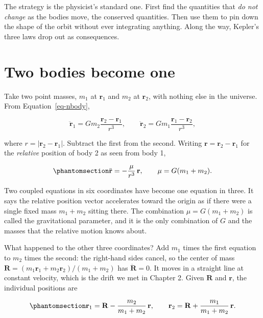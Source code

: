 \documentclass[
  10.5pt,
  letterpaper,
]{scrbook}
\theoremstyle{definition}
\theoremstyle{plain}
\theoremstyle{remark}
\begin{document}
The strategy is the physicist's standard one. First find the quantities
that \emph{do not change} as the bodies move, the conserved quantities.
Then use them to pin down the shape of the orbit without ever
integrating anything. Along the way, Kepler's three laws drop out as
consequences.

\section{Two bodies become one}\label{two-bodies-become-one}

Take two point masses, \(m_1\) at \(\mathbf{r}_1\) and \(m_2\) at
\(\mathbf{r}_2\), with nothing else in the universe. From
Equation~\ref{eq-nbody},

\[
\ddot{\mathbf{r}}_1 = G m_2 \frac{\mathbf{r}_2 - \mathbf{r}_1}{r^3}, \qquad
\ddot{\mathbf{r}}_2 = G m_1 \frac{\mathbf{r}_1 - \mathbf{r}_2}{r^3},
\]

where \(r = |\mathbf{r}_2 - \mathbf{r}_1|\). Subtract the first from the
second. Writing \(\mathbf{r} = \mathbf{r}_2 - \mathbf{r}_1\) for the
\emph{relative} position of body 2 as seen from body 1,

\begin{equation}\protect\phantomsection\label{eq-relative}{
\ddot{\mathbf{r}} = -\frac{\mu}{r^3}\,\mathbf{r}, \qquad \mu = G(m_1 + m_2).
}\end{equation}

Two coupled equations in six coordinates have become one equation in
three. It says the relative position vector accelerates toward the
origin as if there were a single fixed mass \(m_1 + m_2\) sitting there.
The combination \(\mu = G(m_1+m_2)\) is called the gravitational
parameter, and it is the only combination of \(G\) and the masses that
the relative motion knows about.

What happened to the other three coordinates? Add \(m_1\) times the
first equation to \(m_2\) times the second: the right-hand sides cancel,
so the center of mass
\(\mathbf{R} = (m_1\mathbf{r}_1 + m_2\mathbf{r}_2)/(m_1+m_2)\) has
\(\ddot{\mathbf{R}} = 0\). It moves in a straight line at constant
velocity, which is the drift we met in Chapter 2. Given \(\mathbf{R}\)
and \(\mathbf{r}\), the individual positions are

\begin{equation}\protect\phantomsection\label{eq-individual}{
\mathbf{r}_1 = \mathbf{R} - \frac{m_2}{m_1+m_2}\,\mathbf{r}, \qquad
\mathbf{r}_2 = \mathbf{R} + \frac{m_1}{m_1+m_2}\,\mathbf{r}.
}\end{equation}
\end{document}
